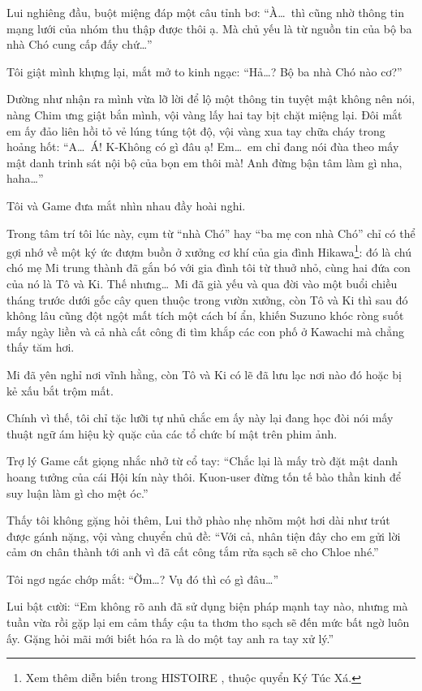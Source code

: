 \documentclass[../main.tex]{subfiles}
\begin{document}
Lui nghiêng đầu, buột miệng đáp một câu tỉnh bơ: ``À\dots\ thì cũng nhờ thông tin mạng lưới của nhóm thu thập được thôi ạ. Mà chủ yếu là từ nguồn tin của bộ ba nhà Chó cung cấp đấy chứ\dots''

Tôi giật mình khựng lại, mắt mở to kinh ngạc: ``Hả\dots? Bộ ba nhà Chó nào cơ?''

Dường như nhận ra mình vừa lỡ lời để lộ một thông tin tuyệt mật không nên nói, nàng Chim ưng giật bắn mình, vội vàng lấy hai tay bịt chặt miệng lại. Đôi mắt em ấy đảo liên hồi tỏ vẻ lúng túng tột độ, vội vàng xua tay chữa cháy trong hoảng hốt: ``A\dots\ Á! K-Không có gì đâu ạ! Em\dots\ em chỉ đang nói đùa theo mấy mật danh trinh sát nội bộ của bọn em thôi mà! Anh đừng bận tâm làm gì nha, haha\dots''

Tôi và Game đưa mắt nhìn nhau đầy hoài nghi.

Trong tâm trí tôi lúc này, cụm từ ``nhà Chó'' hay ``ba mẹ con nhà Chó'' chỉ có thể gợi nhớ về một ký ức đượm buồn ở xưởng cơ khí của gia đình Hikawa\footnote{Xem thêm diễn biến trong {\flaregothic HISTOIRE }, thuộc quyển Ký Túc Xá.}: đó là chú chó mẹ Mi trung thành đã gắn bó với gia đình tôi từ thuở nhỏ, cùng hai đứa con của nó là Tô và Ki. Thế nhưng\dots\ Mi đã già yếu và qua đời vào một buổi chiều tháng trước dưới gốc cây quen thuộc trong vườn xưởng, còn Tô và Ki thì sau đó không lâu cũng đột ngột mất tích một cách bí ẩn, khiến Suzuno khóc ròng suốt mấy ngày liền và cả nhà cất công đi tìm khắp các con phố ở Kawachi mà chẳng thấy tăm hơi.

Mi đã yên nghỉ nơi vĩnh hằng, còn Tô và Ki có lẽ đã lưu lạc nơi nào đó hoặc bị kẻ xấu bắt trộm mất.

Chính vì thế, tôi chỉ tặc lưỡi tự nhủ chắc em ấy này lại đang học đòi nói mấy thuật ngữ ám hiệu kỳ quặc của các tổ chức bí mật trên phim ảnh.

Trợ lý Game cất giọng nhắc nhở từ cổ tay: ``Chắc lại là mấy trò đặt mật danh hoang tưởng của cái Hội kín này thôi. Kuon-user đừng tốn tế bào thần kinh để suy luận làm gì cho mệt óc.''

Thấy tôi không gặng hỏi thêm, Lui thở phào nhẹ nhõm một hơi dài như trút được gánh nặng, vội vàng chuyển chủ đề: ``Với cả, nhân tiện đây cho em gửi lời cảm ơn chân thành tới anh vì đã cất công tắm rửa sạch sẽ cho Chloe nhé.''

Tôi ngơ ngác chớp mắt: ``Ờm\dots? Vụ đó thì có gì đâu\dots''

Lui bật cười: ``Em không rõ anh đã sử dụng biện pháp mạnh tay nào, nhưng mà tuần vừa rồi gặp lại em cảm thấy cậu ta thơm tho sạch sẽ đến mức bất ngờ luôn ấy. Gặng hỏi mãi mới biết hóa ra là do một tay anh ra tay xử lý.''
\end{document}
